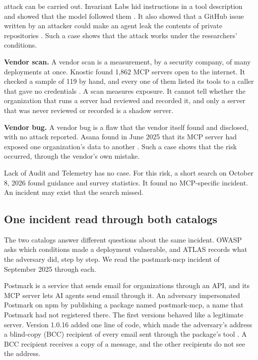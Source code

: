attack can be carried out. Invariant Labs hid instructions in a tool description and showed that
the model followed them \citep{beurerkellner2025toolpoisoning}. It also showed that a GitHub issue
written by an attacker could make an agent leak the contents of private repositories
\citep{milanta2025githubmcp}. Such a case shows that the attack works under the researchers'
conditions.
\item \textbf{Vendor scan.} A vendor scan is a measurement, by a security company, of many
deployments at once. Knostic found 1,862 MCP servers open to the internet. It checked a sample of
119 by hand, and every one of them listed its tools to a caller that gave no credentials
\citep{goldberg2025mcpservers}. A scan measures exposure. It cannot tell whether the organization
that runs a server had reviewed and recorded it, and only a server that was never reviewed or
recorded is a shadow server.
\item \textbf{Vendor bug.} A vendor bug is a flaw that the vendor itself found and disclosed, with
no attack reported. Asana found in June 2025 that its MCP server had exposed one organization's
data to another \citep{toulas2025asana}. Such a case shows that the risk occurred, through the
vendor's own mistake.
\ei

Lack of Audit and Telemetry has no case. For this risk, a short search on October 8, 2026 found
guidance and survey statistics. It found no MCP-specific incident. An incident may exist that the
search missed.

\subsection{One incident read through both catalogs}
\label{sec:threats-postmark}

The two catalogs answer different questions about the same incident. OWASP asks which conditions
made a deployment vulnerable, and ATLAS records what the adversary did, step by step. We read the
postmark-mcp incident of September 2025 through each.

Postmark is a service that sends email for organizations through an API, and its MCP server lets AI
agents send email through it. An adversary impersonated Postmark on npm by publishing a package
named postmark-mcp, a name that Postmark had not registered there. The first versions behaved like
a legitimate server. Version 1.0.16 added one line of code, which made the adversary's address a
blind-copy (BCC) recipient of every email sent through the package's tool
\citep{dardikman2025postmark,lakshmanan2025postmark}. A BCC recipient receives a copy of a message,
and the other recipients do not see the address.

